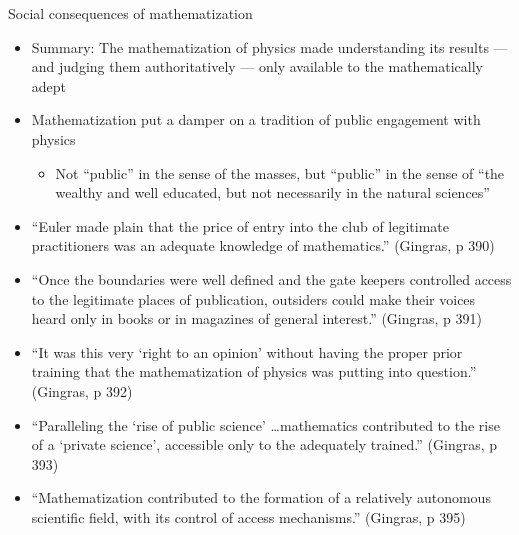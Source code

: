 \documentclass[fleqn]{beamer}
\begin{document}
\begin{frame}{Social consequences of mathematization}

  \begin{itemize}
  \item Summary: The mathematization of physics made understanding its
    results --- and judging them authoritatively --- only available to
    the mathematically adept
  \item Mathematization put a damper on a tradition of public
    engagement with physics
    \begin{itemize}
    \item Not ``public'' in the sense of the masses, but ``public'' in
      the sense of ``the wealthy and well educated, but not
      necessarily in the natural sciences''
    \end{itemize}
  \end{itemize}

\end{frame}

\begin{frame}

  \begin{itemize}
  \item ``Euler made plain that the price of entry into the club of
    legitimate practitioners was an adequate knowledge of
    mathematics.'' (Gingras, p 390)
  \item ``Once the boundaries were well defined and the gate keepers
    controlled access to the legitimate places of publication,
    outsiders could make their voices heard only in books or in
    magazines of general interest.'' (Gingras, p 391)
  \end{itemize}

\end{frame}

\begin{frame}

  \begin{itemize}
  \item ``It was this very `right to an opinion' without having the
    proper prior training that the mathematization of physics was
    putting into question.'' (Gingras, p 392)
  \item ``Paralleling the `rise of public science' \dots mathematics
    contributed to the rise of a `private science', accessible only to
    the adequately trained.'' (Gingras, p 393)
  \item ``Mathematization contributed to the formation of a relatively
    autonomous scientific field, with its control of access
    mechanisms.'' (Gingras, p 395)
  \end{itemize}

\end{frame}
\end{document}
